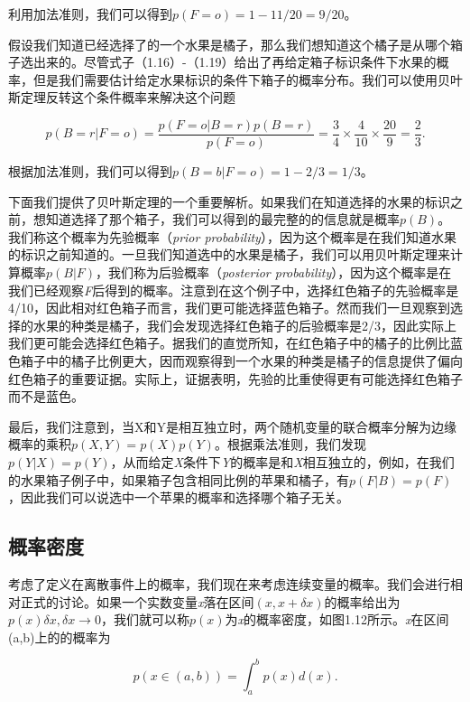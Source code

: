 	利用加法准则，我们可以得到$p(F = o) = 1 - 11/20 = 9/20$。
	
	假设我们知道已经选择了的一个水果是橘子，那么我们想知道这个橘子是从哪个箱子选出来的。尽管式子（1.16）-（1.19）给出了再给定箱子标识条件下水果的概率，但是我们需要估计给定水果标识的条件下箱子的概率分布。我们可以使用贝叶斯定理反转这个条件概率来解决这个问题
	
	\begin{equation}
	p(B = r|F = o) = \frac{p(F = o|B = r)p(B = r)}{p(F = o)} = \frac{3}{4} \times \frac{4}{10} \times \frac{20}{9}= \frac{2}{3}.
	\end{equation}
	
	根据加法准则，我们可以得到$p(B = b|F = o) = 1 -2/3 = 1/3$。
	
	下面我们提供了贝叶斯定理的一个重要解析。如果我们在知道选择的水果的标识之前，想知道选择了那个箱子，我们可以得到的最完整的的信息就是概率$p(B)$。我们称这个概率为先验概率（\textit{prior probability}），因为这个概率是在我们知道水果的标识之前知道的。一旦我们知道选中的水果是橘子，我们可以用贝叶斯定理来计算概率$p(B|F)$，我们称为后验概率（\textit{posterior probability}），因为这个概率是在我们已经观察\textit{F}后得到的概率。注意到在这个例子中，选择红色箱子的先验概率是4/10，因此相对红色箱子而言，我们更可能选择蓝色箱子。然而我们一旦观察到选择的水果的种类是橘子，我们会发现选择红色箱子的后验概率是2/3，因此实际上我们更可能会选择红色箱子。据我们的直觉所知，在红色箱子中的橘子的比例比蓝色箱子中的橘子比例更大，因而观察得到一个水果的种类是橘子的信息提供了偏向红色箱子的重要证据。实际上，证据表明，先验的比重使得更有可能选择红色箱子而不是蓝色。
	
	最后，我们注意到，当X和Y是相互独立时，两个随机变量的联合概率分解为边缘概率的乘积$p(X, Y) = p(X)p(Y)$。根据乘法准则，我们发现$p(Y|X) = p(Y)$，从而给定\textit{X}条件下\textit{Y}的概率是和\textit{X}相互独立的，例如，在我们的水果箱子例子中，如果箱子包含相同比例的苹果和橘子，有$p(F|B) = p(F)$，因此我们可以说选中一个苹果的概率和选择哪个箱子无关。
	
\subsection{概率密度}

	考虑了定义在离散事件上的概率，我们现在来考虑连续变量的概率。我们会进行相对正式的讨论。如果一个实数变量\textit{x}落在区间$(x, x + \delta x)$的概率给出为$p(x)\delta x, \delta x \to 0$，我们就可以称$p(x)$为\textit{x}的概率密度，如图1.12所示。\textit{x}在区间(a,b)上的的概率为
	
	\begin{equation}
	p(x \in (a,b)) = \int_{a}^{b} p(x) d(x).
	\end{equation}
	
